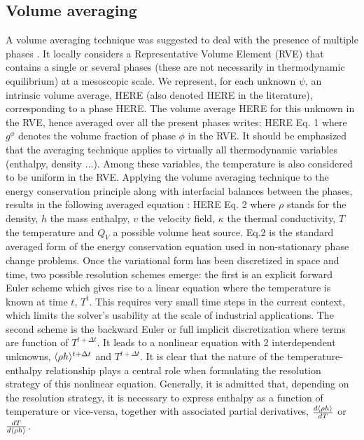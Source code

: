 \subsection{Volume averaging} 
A volume averaging technique was suggested to deal with the presence of multiple phases \cite{ni_volume-averaged_1991}. It locally considers a 
Representative Volume Element (RVE) that contains a single or several phases (these are not necessarily in thermodynamic equilibrium) 
at a mesoscopic scale. We represent, for each unknown $\psi$, an intrinsic volume average, HERE (also denoted HERE in the literature), 
corresponding to a phase HERE. The volume average HERE for this unknown in the RVE, hence averaged over all the present phases writes:
HERE	Eq. 1
where $g^\phi$ denotes the volume fraction of phase $\phi$ in the RVE. It should be emphasized that the averaging technique applies to 
virtually all thermodynamic variables (enthalpy, density $\dots$). Among these variables, the temperature is also considered to be uniform 
in the RVE. Applying the volume averaging technique to the energy conservation principle along with interfacial balances between the phases, 
results in the following averaged equation \cite{rappaz_numerical_2003}:
	HERE	Eq. 2
where $\rho$ stands for the density, $h$ the mass enthalpy, $v$ the velocity field, $\kappa$ the thermal conductivity, $T$ the temperature 
and $Q_V$ a possible volume heat source. Eq.2 is the standard averaged form of the energy conservation equation used in non-stationary phase 
change problems. Once the variational form has been discretized in space and time, two possible resolution schemes emerge: the first is an 
explicit forward Euler scheme which gives rise to a linear equation where the temperature is known at time $t$, $T^t$. This requires very small 
time steps in the current context, which limits the solver’s usability at the scale of industrial applications. The second scheme is the 
backward Euler or full implicit discretization where terms are function of $T^{t+\Delta t}$. It leads to a nonlinear equation with 2 interdependent 
unknowns, $\langle \rho h \rangle^{t+\Delta t}$ and  $T^{t+\Delta t}$. It is clear that the nature of the temperature-enthalpy relationship plays a central 
role when formulating the resolution strategy of this nonlinear equation. Generally, it is admitted that, depending on the resolution strategy, 
it is necessary to express enthalpy as a function of temperature or vice-versa, together with associated partial derivatives, 
$\frac{d \langle \rho h \rangle}{dT}$ or $\frac{dT }{d\langle \rho h \rangle}$.

